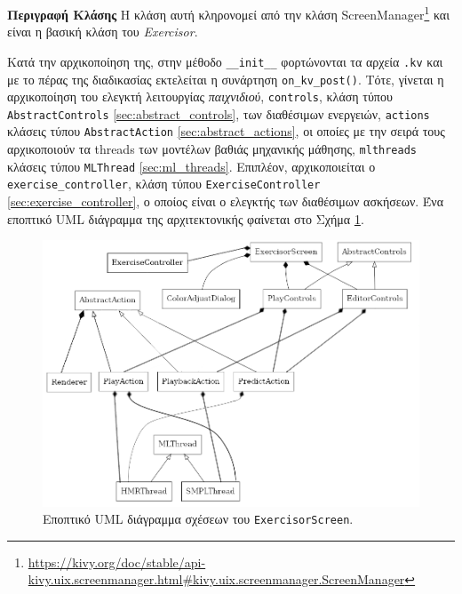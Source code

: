 \noindent\textbf{Περιγραφή Κλάσης}
Η κλάση αυτή κληρονομεί από την κλάση ScreenManager\footnote{ \href{https://kivy.org/doc/stable/api-kivy.uix.screenmanager.html\#kivy.uix.screenmanager.ScreenManager}{https://kivy.org/doc/stable/api-kivy.uix.screenmanager.html\#kivy.uix.screenmanager.ScreenManager}} και είναι η βασική κλάση του \textsl{Exercisor}.

Κατά την αρχικοποίηση της, στην μέθοδο \texttt{\_\_init\_\_} φορτώνονται τα αρχεία \texttt{.kv} και με το πέρας της διαδικασίας εκτελείται η συνάρτηση \texttt{on\_kv\_post()}. Τότε, γίνεται η αρχικοποίηση του ελεγκτή λειτουργίας \textsl{παιχνιδιού}, \texttt{controls}, κλάση τύπου \texttt{AbstractControls} \ref{sec:abstract_controls}, των διαθέσιμων ενεργειών, \texttt{actions} κλάσεις τύπου \texttt{AbstractAction} \ref{sec:abstract_actions}, οι οποίες με την σειρά τους αρχικοποιούν τα threads των μοντέλων βαθιάς μηχανικής μάθησης, \texttt{mlthreads} κλάσεις τύπου \texttt{MLThread} \ref{sec:ml_threads}. Επιπλέον, αρχικοποιείται ο \texttt{exercise\_controller}, κλάση τύπου \texttt{ExerciseController} \ref{sec:exercise_controller}, ο οποίος είναι ο ελεγκτής των διαθέσιμων ασκήσεων. Ένα εποπτικό UML διάγραμμα της αρχιτεκτονικής φαίνεται στο Σχήμα \ref{fig:exercisor_relations}.

\begin{figure}[h]
	\centering
	\includegraphics[scale=0.4]{images/chapter5/overview_exercisor_screen.png}
	\caption{Εποπτικό UML διάγραμμα  σχέσεων του \texttt{ExercisorScreen}.}
	\label{fig:exercisor_relations}
\end{figure}

